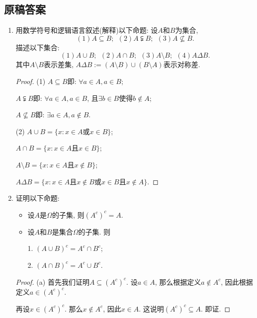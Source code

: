 \documentclass[UTF8,11pt, a4paper, oneside, fontset=none]{ctexbook}
\begin{document}
\clearpage

\subsection*{原稿答案}

\begin{enumerate}


\item 用数学符号和逻辑语言叙述(解释)以下命题: 设$A$和$B$为集合, 
\[
(1) A \subseteq B; \ \ (2) A \subsetneqq B; \ \ (3) A \nsubseteq B.
\]
描述以下集合:
\[
(1) A \cup B; \ \ (2) A \cap B; \ \ (3) A \setminus B; \ \ (4) A \Delta B.
\]
其中$A \setminus B$表示差集, $A \Delta B := (A \setminus B) \cup (B \setminus A)$表示对称差. 


\begin{proof}


(1) $ A \subseteq B $即: $\forall a \in A, a \in B$;

$A \subsetneqq B$即: $\forall a \in A, a \in B$, 且$\exists b \in B$使得$b \notin A$;

$A \nsubseteq B$即: $\exists a \in A, a \notin B$.


(2) $A \cup B = \{x : x \in A \mbox{或} x \in B \}$;

$A \cap B = \{x : x \in A \mbox{且} x \in B \}$;

$A \setminus B = \{ x : x \in A \mbox{且} x \notin B \}$;

$A \Delta B = \{ x : x \in A \mbox{且} x \notin B \mbox{或} x \in B \mbox{且} x \notin A \}$.



\end{proof}


\item 证明以下命题:
\begin{itemize}
\item[(a)] 设$A$是$\Omega$的子集, 则$(A^c)^c = A$.
\item[(b)] 设$A$和$B$是集合$\Omega$的子集. 则

1. $(A \cup B)^c = A^c \cap B^c$;

2. $(A \cap B)^c = A^c \cup B^c$.
\end{itemize}


\begin{proof}

(a) 首先我们证明$A \subseteq (A^c)^c$. 设$a \in A$, 那么根据定义$a \notin A^c$, 因此根据定义$a \in (A^c)^c$.

再设$x \in (A^c)^c$. 那么$x \notin A^c$, 因此$x \in A$. 这说明$(A^c)^c \subseteq A$. 即证. 



\end{proof}
\end{enumerate}
\end{document}
